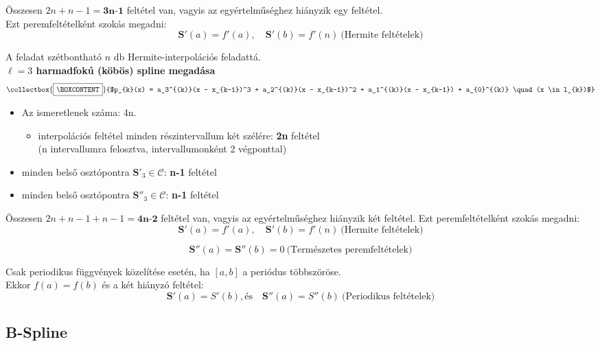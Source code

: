 \documentclass[tikz,12pt,margin=0px]{article}
\newcommand{\mybox}{%
    \collectbox{%
        \setlength{\fboxsep}{4pt}%
        \fbox{\BOXCONTENT}%
    }%
}
\begin{document}
    \noindent Összesen $2n + n-1 = \textbf{3n-1}$ feltétel van, vagyis az egyértelműséghez hiányzik egy feltétel.\\
    Ezt peremfeltételként szokás megadni:
    \[
        \mathbf{S}'(a) = f'(a), \quad \mathbf{S}'(b) = f'(n)\ \text{(Hermite feltételek)}
    \]

    \noindent A feladat szétbontható $n$ db Hermite-interpolációs feladattá.\\
\newpage
    \noindent \textbf{$\ell = 3$ harmadfokú (köbös) spline megadása\\}
    \[
        \mybox{$p_{k}(x) = a_3^{(k)}(x - x_{k-1})^3 + a_2^{(k)}(x - x_{k-1})^2 + a_1^{(k)}(x - x_{k-1}) + a_{0}^{(k)} \quad (x \in l_{k})$}
    \]

    \begin{itemize}
        \item Az ismeretlenek száma: 4n.
        \begin{itemize}
            \item interpolációs feltétel minden részintervallum két szélére: \textbf{2n} feltétel\\
            (n intervallumra felosztva, intervallumonként 2 végponttal)
        \end{itemize}
        \item minden belső osztópontra $\mathbf{S}'_{3} \in \mathcal{C}$: \textbf{n-1} feltétel
        \item minden belső osztópontra $\mathbf{S}''_{3} \in \mathcal{C}$: \textbf{n-1} feltétel
    \end{itemize}

    \noindent Összesen $2n + n-1 + n-1 = \textbf{4n-2}$ feltétel van, vagyis az egyértelműséghez hiányzik két feltétel. Ezt peremfeltételként szokás megadni:
    \[
        \mathbf{S}'(a) = f'(a), \quad \mathbf{S}'(b) = f'(n)\ \text{(Hermite feltételek)}
    \]

    \[
        \mathbf{S}''(a) = \mathbf{S}''(b) = 0\ \text{(Természetes peremfeltételek)}
    \]

    \noindent Csak periodikus függvények közelítése esetén, ha $[a, b]$ a periódus többszöröse.\\
    Ekkor $f(a) = f(b)$ és a két hiányzó feltétel:
    \[
        \mathbf{S}'(a) = S'(b), \text{és} \quad \mathbf{S}''(a) = S''(b)\ \text{(Periodikus feltételek)}
    \]

    \subsection*{B-Spline\\}
	
\end{document}
